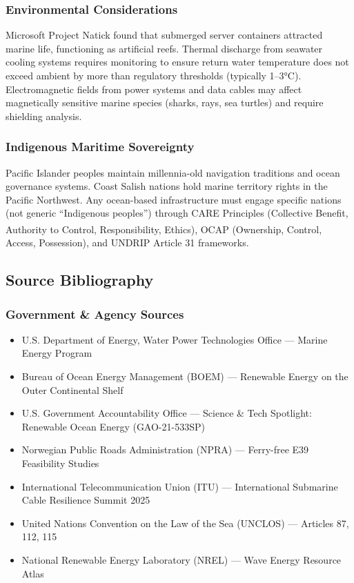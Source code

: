 \documentclass[11pt,letterpaper]{article}
\begin{document}
\subsubsection{Environmental Considerations}

Microsoft Project Natick found that submerged server containers attracted marine life, functioning as artificial reefs. Thermal discharge from seawater cooling systems requires monitoring to ensure return water temperature does not exceed ambient by more than regulatory thresholds (typically 1--3°C). Electromagnetic fields from power systems and data cables may affect magnetically sensitive marine species (sharks, rays, sea turtles) and require shielding analysis.

\subsubsection{Indigenous Maritime Sovereignty}

Pacific Islander peoples maintain millennia-old navigation traditions and ocean governance systems. Coast Salish nations hold marine territory rights in the Pacific Northwest. Any ocean-based infrastructure must engage specific nations (not generic ``Indigenous peoples'') through CARE Principles (Collective Benefit, Authority to Control, Responsibility, Ethics), OCAP\textsuperscript{\textregistered} (Ownership, Control, Access, Possession), and UNDRIP Article 31 frameworks.

\subsection{Source Bibliography}

\subsubsection{Government \& Agency Sources}

\begin{itemize}[leftmargin=2em]
  \item U.S. Department of Energy, Water Power Technologies Office --- Marine Energy Program
  \item Bureau of Ocean Energy Management (BOEM) --- Renewable Energy on the Outer Continental Shelf
  \item U.S. Government Accountability Office --- Science \& Tech Spotlight: Renewable Ocean Energy (GAO-21-533SP)
  \item Norwegian Public Roads Administration (NPRA) --- Ferry-free E39 Feasibility Studies
  \item International Telecommunication Union (ITU) --- International Submarine Cable Resilience Summit 2025
  \item United Nations Convention on the Law of the Sea (UNCLOS) --- Articles 87, 112, 115
  \item National Renewable Energy Laboratory (NREL) --- Wave Energy Resource Atlas
\end{itemize}
\end{document}

